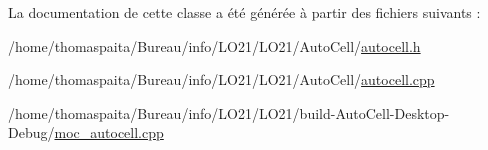 La documentation de cette classe a été générée à partir des fichiers suivants \+:\begin{DoxyCompactItemize}
\item 
/home/thomaspaita/\+Bureau/info/\+L\+O21/\+L\+O21/\+Auto\+Cell/\hyperlink{autocell_8h}{autocell.\+h}\item 
/home/thomaspaita/\+Bureau/info/\+L\+O21/\+L\+O21/\+Auto\+Cell/\hyperlink{autocell_8cpp}{autocell.\+cpp}\item 
/home/thomaspaita/\+Bureau/info/\+L\+O21/\+L\+O21/build-\/\+Auto\+Cell-\/\+Desktop-\/\+Debug/\hyperlink{moc__autocell_8cpp}{moc\+\_\+autocell.\+cpp}\end{DoxyCompactItemize}
